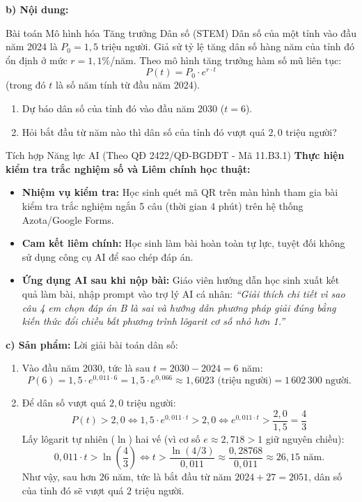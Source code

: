 \documentclass[12pt, a4paper]{article}
\begin{document}
\noindent \textbf{b) Nội dung:}
\begin{stembox}{Bài toán Mô hình hóa Tăng trưởng Dân số (STEM)}
Dân số của một tỉnh vào đầu năm 2024 là $P_0 = 1{,}5$ triệu người. Giả sử tỷ lệ tăng dân số hàng năm của tỉnh đó ổn định ở mức $r = 1{,}1\%$/năm. Theo mô hình tăng trưởng hàm số mũ liên tục:
$$P(t) = P_0 \cdot e^{r \cdot t}$$
(trong đó $t$ là số năm tính từ đầu năm 2024).
\begin{enumerate}[leftmargin=0.6cm]
    \item Dự báo dân số của tỉnh đó vào đầu năm 2030 ($t = 6$).
    \item Hỏi bắt đầu từ năm nào thì dân số của tỉnh đó vượt quá $2{,}0$ triệu người?
\end{enumerate}
\end{stembox}

\begin{aibox}{Tích hợp Năng lực AI (Theo QĐ 2422/QĐ-BGDĐT - Mã 11.B3.1)}
\textbf{Thực hiện kiểm tra trắc nghiệm số và Liêm chính học thuật:}
\begin{itemize}[leftmargin=0.6cm]
    \item \textbf{Nhiệm vụ kiểm tra:} Học sinh quét mã QR trên màn hình tham gia bài kiểm tra trắc nghiệm ngắn 5 câu (thời gian 4 phút) trên hệ thống Azota/Google Forms.
    \item \textbf{Cam kết liêm chính:} Học sinh làm bài hoàn toàn tự lực, tuyệt đối không sử dụng công cụ AI để sao chép đáp án.
    \item \textbf{Ứng dụng AI sau khi nộp bài:} Giáo viên hướng dẫn học sinh xuất kết quả làm bài, nhập prompt vào trợ lý AI cá nhân: \textit{``Giải thích chi tiết vì sao câu 4 em chọn đáp án B là sai và hướng dẫn phương pháp giải đúng bằng kiến thức đổi chiều bất phương trình lôgarit cơ số nhỏ hơn 1.''}
\end{itemize}
\end{aibox}

\noindent \textbf{c) Sản phẩm:}
Lời giải bài toán dân số:
\begin{enumerate}[leftmargin=0.6cm]
    \item Vào đầu năm 2030, tức là sau $t = 2030 - 2024 = 6$ năm:
    $$P(6) = 1{,}5 \cdot e^{0{,}011 \cdot 6} = 1{,}5 \cdot e^{0{,}066} \approx 1{,}6023\text{ (triệu người)} = 1\,602\,300\text{ người}.$$
    \item Để dân số vượt quá $2{,}0$ triệu người:
    $$P(t) > 2{,}0 \iff 1{,}5 \cdot e^{0{,}011 \cdot t} > 2{,}0 \iff e^{0{,}011 \cdot t} > \dfrac{2{,}0}{1{,}5} = \dfrac{4}{3}$$
    Lấy lôgarit tự nhiên ($\ln$) hai vế (vì cơ số $e \approx 2{,}718 > 1$ giữ nguyên chiều):
    $$0{,}011 \cdot t > \ln\left(\dfrac{4}{3}\right) \iff t > \dfrac{\ln(4/3)}{0{,}011} \approx \dfrac{0{,}28768}{0{,}011} \approx 26{,}15\text{ năm}.$$
    Như vậy, sau hơn $26$ năm, tức là bắt đầu từ năm $2024 + 27 = 2051$, dân số của tỉnh đó sẽ vượt quá $2$ triệu người.
\end{enumerate}
\end{document}
